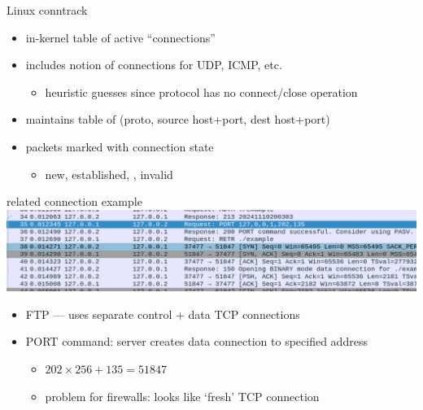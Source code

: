 \begin{frame}{Linux conntrack}
    \begin{itemize}
    \item in-kernel table of active ``connections''
    \item includes notion of connections for UDP, ICMP, etc.
        \begin{itemize}
        \item heuristic guesses since protocol has no connect/close operation
        \end{itemize}
    \item maintains table of (proto, source host+port, dest host+port)
    \item packets marked with connection state
        \begin{itemize}
        \item new, established, , invalid
        \end{itemize}
    \end{itemize}
\end{frame}

\begin{frame}{related connection example}
\includegraphics[width=\textwidth]{../fire/ftp-port-ex.png}
\begin{itemize}
\item FTP --- uses separate control + data TCP connections
\vspace{.5cm}
\item PORT command: server creates data connection to specified address
    \begin{itemize}
    \item $202 \times 256 + 135 = 51847$
    \item problem for firewalls: looks like `fresh' TCP connection
    \end{itemize}
\end{itemize}
\end{frame}

